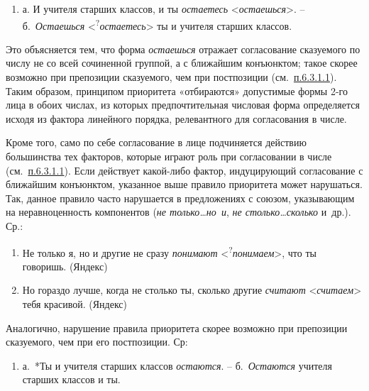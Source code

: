 \begin{enumerate}
\def\labelenumi{(\arabic{enumi})}
\setcounter{enumi}{122}
\item
  а. И учителя старших классов, и ты \emph{остаетесь}
  \textless*\emph{остаешься}\textgreater. -- б.~\emph{Остаешься}
  \textless{}\textsuperscript{?}\emph{остаетесь}\textgreater{} ты и
  учителя старших классов.
\end{enumerate}

Это объясняется тем, что форма \emph{остаешься} отражает согласование
сказуемого по числу не со всей сочиненной группой, а с ближайшим
конъюнктом; такое скорее возможно при препозиции сказуемого, чем при
постпозиции (см.~\underline{п.6.3.1.1}). Таким образом, принципом
приоритета «отбираются» допустимые формы 2-го лица в обоих числах, из
которых предпочтительная числовая форма определяется исходя из фактора
линейного порядка, релевантного для согласования в числе.

Кроме того, само по себе согласование в лице подчиняется действию
большинства тех факторов, которые играют роль при согласовании в числе
(см.~\underline{п.6.3.1.1}). Если действует какой-либо фактор,
индуцирующий согласование с ближайшим конъюнктом, указанное выше правило
приоритета может нарушаться. Так, данное правило часто нарушается в
предложениях с союзом, указывающим на неравноценность компонентов
(\emph{не только\ldots но~и}, \emph{не столько\ldots сколько} и~др.).
Ср.:

\begin{enumerate}
\def\labelenumi{(\arabic{enumi})}
\setcounter{enumi}{123}
\item
  Не только я, но и другие не сразу \emph{понимают}
  \textless{}\textsuperscript{?}\emph{понимаем}\textgreater, что ты
  говоришь. (Яндекс)
\item
  Но гораздо лучше, когда не столько ты, сколько другие \emph{считают}
  \textless*\emph{считаем}\textgreater{} тебя красивой. (Яндекс)
\end{enumerate}

Аналогично, нарушение правила приоритета скорее возможно при препозиции
сказуемого, чем при его постпозиции. Ср:

\begin{enumerate}
\def\labelenumi{(\arabic{enumi})}
\setcounter{enumi}{125}
\item
  а.~*Ты и учителя старших классов \emph{остаются}. --
  б.~\emph{Остаются} учителя старших классов и ты.
\end{enumerate}

